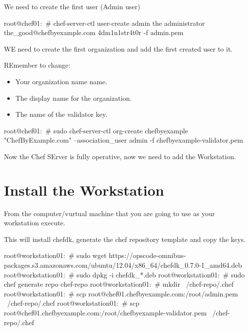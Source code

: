 We need to create the first user (Admin user)

\begin{codelisting}
\label{code:}
\codecaption{}
\begin{code}
root@chef01:~# chef-server-ctl user-create admin the administrator the_good@chefbyexample.com 4dm1n1str4t0r -f admin.pem
\end{code}
\end{codelisting}

WE need to create the first organization and add the first created user to it.

REmember to change:

\begin{itemize}
\item Your organization name name.
\item The display name for the organization.
\item The name of the validator key.
\end{itemize}

\begin{codelisting}
\label{code:}
\codecaption{}
\begin{code}
root@chef01:~# sudo chef-server-ctl org-create chefbyexample "ChefByExample.com" --association_user admin -f chefbyexample-validator.pem
\end{code}
\end{codelisting}


Now the Chef SErver is fully operative, now we need to add the Workstation.

\section{Install the Workstation}

From the computer/vurtual machine that you are going to use as your workstation execute.

This will install chefdk, generate the chef repository template and copy the keys.

\begin{codelisting}
\label{code:}
\codecaption{}
\begin{code}
root@workstation01:~# sudo wget https://opscode-omnibus-packages.s3.amazonaws.com/ubuntu/12.04/x86_64/chefdk_0.7.0-1_amd64.deb
root@workstation01:~# sudo dpkg -i chefdk_*.deb
root@workstation01:~# sudo chef generate repo chef-repo
root@workstation01:~# mkdir ~/chef-repo/.chef
root@workstation01:~# scp root@chef01.chefbyexample.com:/root/admin.pem ~/chef-repo/.chef
root@workstation01:~# scp root@chef01.chefbyexample.com:/root/chefbyexample-validator.pem ~/chef-repo/.chef
\end{code}
\end{codelisting}

